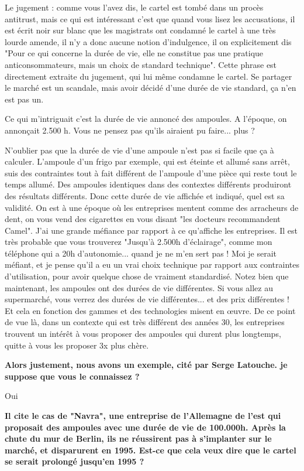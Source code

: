\begin{small}
Le jugement : comme vous l'avez dis, le cartel est tombé dans un procès antitrust, mais ce qui est intéressant c'est que quand vous lisez les accusations, il est écrit noir sur blanc que les magistrats ont condamné le cartel à une très lourde amende, il n'y a donc aucune notion d'indulgence, il on explicitement dis "Pour ce qui concerne la durée de vie, elle ne constitue pas une pratique anticonsommateurs, mais un choix de standard technique". Cette phrase est directement extraite du jugement, qui lui même condamne le cartel. Se partager le marché est un scandale, mais avoir décidé d'une durée de vie standard, ça n'en est pas un.

Ce qui m'intriguait c'est la  durée de vie annoncé des ampoules. A l'époque, on annonçait 2.500 h. Vous ne pensez pas qu'ils airaient pu faire... plus ?

N'oublier pas que la durée de vie d'une ampoule n'est pas si facile que ça à calculer. L'ampoule d'un frigo par exemple, qui est éteinte et allumé sans arrêt, suis des contraintes tout à fait différent de l'ampoule d'une pièce qui reste tout le temps allumé.
Des ampoules identiques dans des contextes différents produiront des résultats différents. Donc cette durée de vie affichée et indiqué, quel est sa validité. On est à une époque où les entreprises mentent comme des arracheurs de dent, on vous vend des cigarettes en vous disant "les docteurs recommandent Camel". J'ai une grande méfiance par rapport à ce qu'affiche les entreprises. Il est très probable que vous trouverez "Jusqu'à 2.500h d'éclairage", comme mon téléphone qui a 20h d'autonomie... quand je ne m'en sert pas !
Moi je serait méfiant, et je pense qu'il a eu un vrai choix technique par rapport aux contraintes d'utilisation, pour avoir quelque chose de vraiment standardisé.
Notez bien que maintenant, les ampoules ont des durées de vie différentes. Si vous allez au supermarché, vous verrez des durées de vie différentes... et des prix différentes ! Et cela en fonction des gammes et des technologies misent en œuvre.
De ce point de vue là, dans un contexte qui est très différent des années 30, les entreprises trouvent un intérêt à vous proposer des ampoules qui durent plus longtemps, quitte à vous les proposer 3x plus chère.

\textbf{Alors justement, nous avons un exemple, cité par Serge Latouche. je suppose que vous le connaissez ?}
\smallbreak


Oui

\textbf{Il cite le cas de "Navra", une entreprise de l'Allemagne de l'est qui proposait des ampoules avec une durée de vie de 100.000h. Après la chute du mur de Berlin, ils ne réussirent pas à s'implanter sur le marché, et disparurent en 1995. Est-ce que cela veux dire que le cartel se serait prolongé jusqu'en 1995 ?}
\smallbreak



\end{small}

